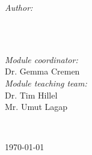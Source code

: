 \begin{titlepage}
  \begin{minipage}{0.4\textwidth}
    \begin{flushleft} \large
      \emph{Author:}\\
      \@author %
      \\[1.2em]
    \end{flushleft}
  \end{minipage}
  ~
  \begin{minipage}{0.4\textwidth}
    \begin{flushright} \large
      \emph{Module coordinator:} \\
      Dr. Gemma Cremen \\[1.2em] %
      \emph{Module teaching team:} \\
      Dr. Tim Hillel\\ %
      Mr. Umut Lagap
    \end{flushright}
  \end{minipage}\\[2cm]
  \makeatother



  {\large \today}\\[2cm] %

  \vfill %

\end{titlepage}